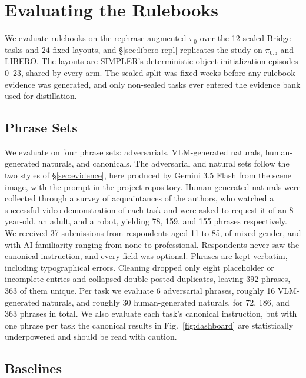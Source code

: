 \documentclass[letterpaper, 10 pt, conference]{ieeeconf} %
\begin{document}

\section{Evaluating the Rulebooks}
\label{sec:rules-results}

We evaluate rulebooks on the rephrase-augmented $\pi_0$ over the 12 sealed Bridge tasks and 24 fixed layouts, and \S\ref{sec:libero-repl} replicates the study on $\pi_{0.5}$ and LIBERO. The layouts are SIMPLER's deterministic object-initialization episodes 0--23, shared by every arm. The sealed split was fixed weeks before any rulebook evidence was generated, and only non-sealed tasks ever entered the evidence bank used for distillation.

\subsection{Phrase Sets}
\label{sec:phrase-sets}

We evaluate on four phrase sets: adversarials, VLM-generated naturals, human-generated naturals, and canonicals. The adversarial and natural sets follow the two styles of \S\ref{sec:evidence}, here produced by Gemini 3.5 Flash from the scene image, with the prompt in the project repository. Human-generated naturals were collected through a survey of acquaintances of the authors, who watched a successful video demonstration of each task and were asked to request it of an 8-year-old, an adult, and a robot, yielding 78, 159, and 155 phrases respectively.
We received 37 submissions from respondents aged 11 to 85, of mixed gender, and with AI familiarity ranging from none to professional. Respondents never saw the canonical instruction, and every field was optional. Phrases are kept verbatim, including typographical errors. Cleaning dropped only eight placeholder or incomplete entries and collapsed double-posted duplicates, leaving 392 phrases, 363 of them unique.
Per task we evaluate 6 adversarial phrases, roughly 16 VLM-generated naturals, and roughly 30 human-generated naturals, for 72, 186, and 363 phrases in total. We also evaluate each task's canonical instruction, but with one phrase per task the canonical results in Fig.~\ref{fig:dashboard} are statistically underpowered and should be read with caution.

\subsection{Baselines}
\end{document}
